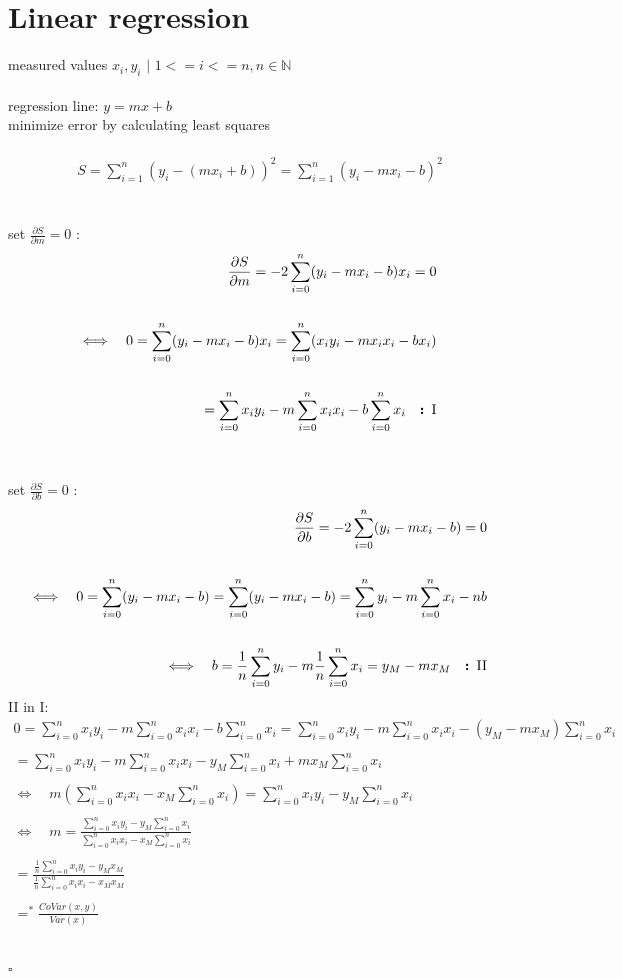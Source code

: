\documentclass[a4paper]{article}
\begin{document}
\section{Linear regression}
measured values $x_i,y_i$ $|$ $1<=i<=n, n\in \mathbb{N}$
\\\\
regression line: $y=mx+b$\\
minimize error by calculating least squares
\\\\
\begin{align*}
S=\sum_{i=1}^{n}(y_i-(mx_i+b))^2=\sum_{i=1}^{n}(y_i-mx_i-b)^2
\end{align*}
\\\\
set $\frac{\partial S}{\partial m}=0$ :
\begin{align*}
\frac{\partial S}{\partial m}=-2\sum_{i=0}^{n}(y_i-mx_i-b)x_i=0
\\\\
\Longleftrightarrow \quad 0=\sum_{i=0}^{n}(y_i-mx_i-b)x_i=\sum_{i=0}^{n}(x_iy_i-mx_ix_i-bx_i)
\\\\
=\sum_{i=0}^{n}x_iy_i-m\sum_{i=0}^{n}x_ix_i-b\sum_{i=0}^{n}x_i \quad \textbf{: \rm I}
\end{align*}
\\\\
set $\frac{\partial S}{\partial b}=0$ :
\begin{align*}
\frac{\partial S}{\partial b}=-2\sum_{i=0}^{n}(y_i-mx_i-b)=0
\\\\
\Longleftrightarrow \quad 0=\sum_{i=0}^{n}(y_i-mx_i-b)=\sum_{i=0}^{n}(y_i-mx_i-b)=\sum_{i=0}^{n}y_i-m\sum_{i=0}^{n}x_i-nb
\\\\
\Longleftrightarrow \quad b=\frac{1}{n}\sum_{i=0}^{n}y_i-m\frac{1}{n}\sum_{i=0}^{n}x_i=y_M-mx_M \quad \textbf{: \rm II}
\end{align*}
\rm{II} in \rm{I}:
\begin{align*}
0=\sum_{i=0}^{n}x_iy_i-m\sum_{i=0}^{n}x_ix_i-b\sum_{i=0}^{n}x_i=\sum_{i=0}^{n}x_iy_i-m\sum_{i=0}^{n}x_ix_i-(y_M-mx_M)\sum_{i=0}^{n}x_i
\\\\
=\sum_{i=0}^{n}x_iy_i-m\sum_{i=0}^{n}x_ix_i-y_M\sum_{i=0}^{n}x_i+mx_M\sum_{i=0}^{n}x_i
\\\\
\Longleftrightarrow \quad m\left(\sum_{i=0}^{n}x_ix_i-x_M\sum_{i=0}^{n}x_i\right)=\sum_{i=0}^{n}x_iy_i-y_M\sum_{i=0}^{n}x_i
\\\\
\Longleftrightarrow \quad m=\frac{\sum_{i=0}^{n}x_iy_i-y_M\sum_{i=0}^{n}x_i}{\sum_{i=0}^{n}x_ix_i-x_M\sum_{i=0}^{n}x_i}
\\\\
=\frac{\frac{1}{n}\sum_{i=0}^{n}x_iy_i-y_Mx_M}{\frac{1}{n}\sum_{i=0}^{n}x_ix_i-x_Mx_M}
\\\\
=^*\frac{CoVar(x,y)}{Var(x)}
\end{align*}
\\\\
$\square$
\end{document}
